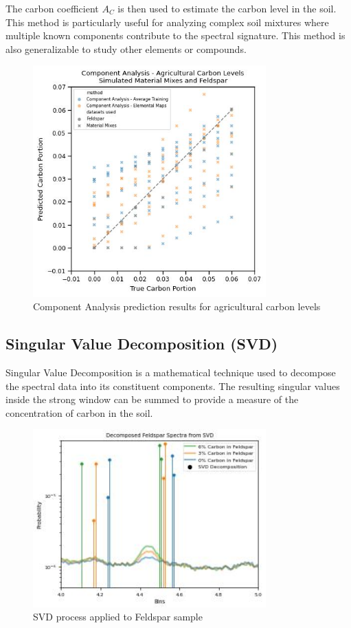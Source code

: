 \documentclass[review]{elsarticle}
\begin{document}
The carbon coefficient $A_C$ is then used to estimate the carbon level in the soil. This method is particularly useful for analyzing complex soil mixtures where multiple known components contribute to the spectral signature. This method is also generalizable to study other elements or compounds.

\begin{figure}[H]
\centering
\includegraphics[width=0.8\textwidth]{../Figures/Analysis/CA_Agricultural_Carbon_Levels.jpg}
\caption{Component Analysis prediction results for agricultural carbon levels}
\label{fig:component_analysis_results}
\end{figure}

\subsection{Singular Value Decomposition (SVD)}

Singular Value Decomposition is a mathematical technique used to decompose the spectral data into its constituent components. The resulting singular values inside the strong window can be summed to provide a measure of the concentration of carbon in the soil.

\begin{figure}[H]
\centering
\includegraphics[width=0.8\textwidth]{../Figures/Analysis/decomposed_feldspar_svd.jpg}
\caption{SVD process applied to Feldspar sample}
\label{fig:svd_decomposition}
\end{figure}
\end{document}
